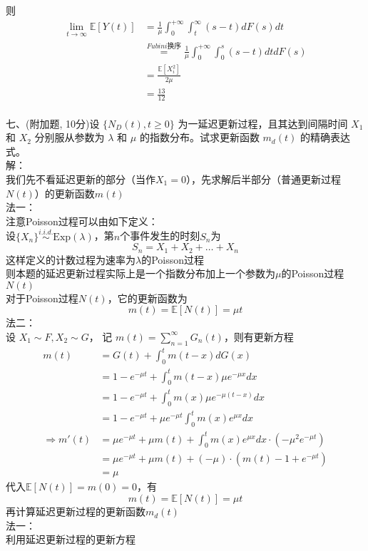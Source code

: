 \documentclass[UTF8]{ctexart}
\begin{document}
则
$$
\begin{aligned}
	\lim_{t\to \infty}\mathbb{E}[Y(t)]&=\frac{1}{\mu}\int_{0}^{+\infty} \int_{t}^{\infty}(s-t)dF(s)dt\\
	&\stackrel{Fubini\text{换序}}{=}\frac{1}{\mu}\int_{0}^{+\infty} \int_{0}^{s}(s-t)dtdF(s)\\
	&=\frac{\mathbb{E}[X_i^2]}{2\mu}\\
	&=\frac{13}{12}
\end{aligned}
$$\\



\noindent 七、(附加题, 10分)设 $\{N_D(t), t \geq 0\}$ 为一延迟更新过程，且其达到间隔时间 $X_1$ 和 $X_2$ 分别服从参数为 $\lambda$ 和 $\mu$ 的指数分布。试求更新函数 $m_d(t)$ 的精确表达式。\\
解：\\
我们先不看延迟更新的部分（当作$X_1=0$），先求解后半部分（普通更新过程$N(t)$）的更新函数$m(t)$\\
法一：\\
注意Poisson过程可以由如下定义：\\
设$\{X_n\}\stackrel{i.i.d.}{\sim} \mathrm{Exp}(\lambda)$，第$n$个事件发生的时刻$S_n$为
\[
S_n=X_1+X_2+\dots+X_n
\]
这样定义的计数过程为速率为$\lambda$的Poisson过程\\
则本题的延迟更新过程实际上是一个指数分布加上一个参数为$\mu$的Poisson过程$N(t)$\\
对于Poisson过程$N(t)$，它的更新函数为
\[
m(t)=\mathbb{E}[N(t)]=\mu t
\]
法二：\\
设 $X_1\sim F,X_2\sim G$，
记 $m(t)=\sum_{n=1}^{\infty}G_n(t)$，则有更新方程
\begin{align*}
	m(t)&=G(t) + \int_0^t m(t - x) dG(x)\\
	&=1-e^{-\mu t}+\int_0^t m(t - x)  \mu e^{-\mu x}dx\\
	&=1-e^{-\mu t}+\int_0^t m(x)  \mu e^{-\mu (t-x)}dx\\
	&=1-e^{-\mu t}+\mu e^{-\mu t}\int_0^t m(x)e^{\mu x}dx\\
	\Rightarrow m'(t)&=\mu e^{-\mu t}+\mu m(t)+\int_0^t m(x)e^{\mu x}dx\cdot(-\mu^2e^{-\mu t})\\
	&=\mu e^{-\mu t}+\mu m(t)+(-\mu)\cdot(m(t)-1+e^{-\mu t})\\
	&=\mu
\end{align*}
代入$\mathbb{E}[N(t)]=m(0)=0$，有
\[
m(t)=\mathbb{E}[N(t)]=\mu t
\]
再计算延迟更新过程的更新函数$m_d(t)$\\
法一：\\
利用延迟更新过程的更新方程
\end{document}
